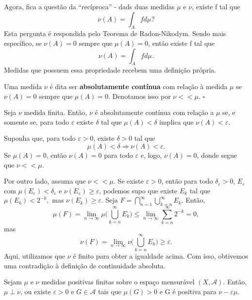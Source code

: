 \documentclass[MeasureTheory/measure_theory.tex]{subfiles}
\begin{document}
Agora, fica a questão da ``recíproca'' - dads duas medidas \(\mu \) e \(\nu \), existe f tal que
\[
	\nu (A) = \int_{A}f d\mu_{}?
\]
Esta pergunta é respondida pelo Teorema de Radon-Nikodym. Sendo mais específico, se \(\nu (A) = 0\) sempre que \(\mu (A) = 0\), então existe f tal que
\[
	\nu (A) = \int_{A}f d\mu_{}.
\]
Medidas que possuem essa propriedade recebem uma definição própria.
\begin{def*}
	Uma medida \(\nu \) é dita ser \textbf{absolutamente contínua} com relação à medida \(\mu \) se
	\(\nu (A) = 0\) sempre que \(\mu (A) = 0\). Denotamos isso por \(\nu <<\mu .\) \(\square\)
\end{def*}
\begin{prop*}
	Seja \(\nu \) medida finita. Então, \(\nu \) é absolutamente contínua com relação a \(\mu \) se, e somente se, para todo \(\varepsilon \) existe \(\delta \) tal que \(\mu (A) < \delta \) implica que \(\nu (A) < \varepsilon .\)
\end{prop*}
\begin{proof*}
	Suponha que, para todo \(\varepsilon > 0\), existe \(\delta > 0\) tal que
	\[
		\mu (A) < \delta \Rightarrow \nu (A) < \varepsilon .
	\]
	Se \(\mu (A) = 0\), então \(\nu (A) = 0\) para todo \(\varepsilon \) e, logo, \(\nu (A) = 0\), donde segue que \(\nu << \mu .\)

	Por outro lado, assuma que \(\nu <<\mu .\) Se existe \(\varepsilon > 0\), então para todo \(\delta_{\varepsilon } > 0\), \(E_{\varepsilon }\) com \(\mu (E_{\varepsilon }) < \delta_{\varepsilon } \) e \(\nu (E_{\varepsilon })\geq \varepsilon \), podemos supo que existe
	\(E_{k}\) tal que \(\mu (E_{k}) < 2^{-k},\) mas \(\nu (E_{k})\geq \varepsilon .\) Seja \(F = \bigcap_{n=1}^{\infty}\bigcup_{k=n}^{\infty}E_{k}.\) Então,
	\[
		\mu (F)=\lim_{n\to \infty}\mu \biggl(\bigcup_{k=n}^{\infty}E_{k}\biggr)\leq \lim_{n\to \infty}\sum\limits_{k=n}^{\infty}2^{-k} = 0,
	\]
	mas
	\[
		\nu (F) = \lim_{n\to \infty}\nu \biggl(\bigcup_{k=n}^{\infty}E_{k}\biggr)\geq \varepsilon .
	\]
	Aqui, utilizamos que \(\nu \) é finito para obter a igualdade acima. Com isso, obtivemos uma contradição à definição de continuidade absoluta.\qedsymbol
\end{proof*}
\begin{lemma*}
	Sejam \(\mu \) e \(\nu \) medidas positivas finitas sobre o espaço mensurável \((X, \mathcal{A}).\) Então, \(\mu \perp \nu \), ou existe \(\varepsilon > 0\) e \(G\in \mathcal{A}\) tais que \(\mu (G) > 0\) e G é positiva para \(\nu - \varepsilon \mu .\)
\end{lemma*}
\end{document}
